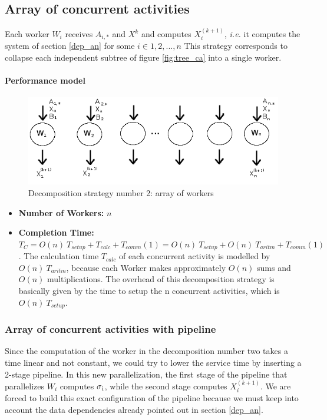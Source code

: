 \documentclass{article}
\begin{document}
\subsection{Array of concurrent activities}
Each worker $W_{i}$ receives $A_{i,*}$ and $X^{k}$ and computes $X_{i}^{(k+1)}$, \textit{i.e.} it computes the system of section \ref{dep_an} for some $i \in {1,2, ... , n}$ This strategy corresponds to collapse each independent subtree of figure \ref{fig:tree_ca} into a single worker.
\paragraph{Performance model} 

\begin{figure}[h]
\centering
\includegraphics[scale=0.48]{array_ca}
\caption{Decomposition strategy number 2: array of workers}
\label{fig:array_ca}
\end{figure} 

\begin{itemize}
\item \textbf{Number of Workers:} $n$
\item \textbf{Completion Time:} $T_{C} = O(n) \: T_{setup} + T_{calc} + T_{comm}(1) = O(n) \: T_{setup} + O(n) \: T_{aritm} + T_{comm}(1)$. The calculation time $T_{calc}$ of each concurrent activity is modelled by $O(n) \: T_{aritm}$, because each Worker makes approximately $O(n)$ sums and $O(n)$ multiplications. The overhead of this decomposition strategy is basically given by the time to setup the n concurrent activities, which is $O(n) \: T_{setup}$.
\end{itemize}

\subsubsection{Array of concurrent activities with pipeline}
Since the computation of the worker in the decomposition number two takes a time linear and not constant, we could try to lower the service time by inserting a 2-stage pipeline. In this new parallelization, the first stage of the pipeline that parallelizes $W_i$ computes $\sigma\textsubscript{i}$, while the second stage computes $X_{i}^{(k+1)}$. We are forced to build this exact configuration of the pipeline because we must keep into account the data dependencies already pointed out in section \ref{dep_an}.\\ 
\end{document}
